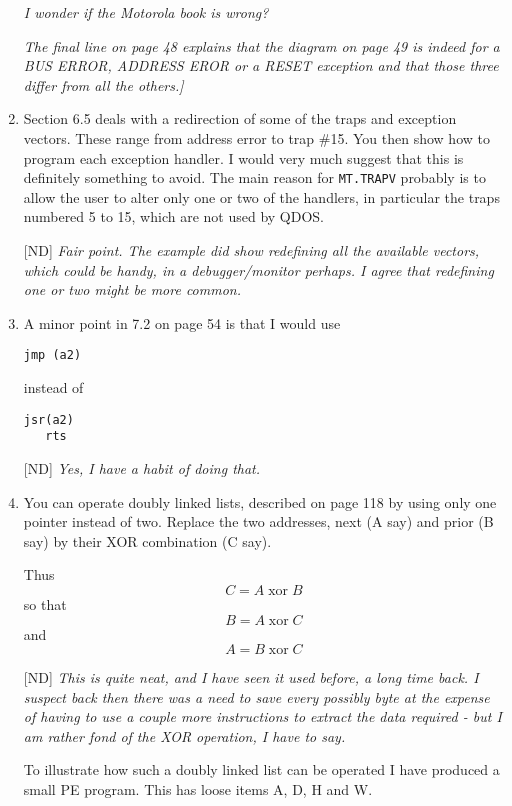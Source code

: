 \begin{enumerate}
\emph{I wonder if the Motorola book is wrong?}

\emph{The final line on page 48 explains that the diagram on page 49 is indeed for a BUS ERROR, ADDRESS EROR or a RESET exception and that those three differ from all the others.]}

\item Section 6.5 deals with a redirection of some of the traps and exception vectors. These range from address error to trap \#15. You then show how to program each exception handler. I would very much suggest that this is definitely something to avoid. The main reason for \texttt{MT.TRAPV} probably is to allow the user to alter only one or two of the handlers, in particular the traps numbered 5 to 15, which are not used by QDOS.

[ND] \emph{Fair point. The example did show redefining all the available vectors, which could be handy, in a debugger/monitor perhaps. I agree that redefining one or two might be more common.}

\item A minor point in 7.2 on page 54 is that I would use

\begin{lstlisting}[firstnumber=1,caption={Saving an RTS Instruction}]
   jmp (a2)
\end{lstlisting}

instead of

\begin{lstlisting}[firstnumber=1,caption={Wasting an RTS Instruction}]
   jsr(a2)
   rts
\end{lstlisting}

[ND]  \emph{Yes, I have a habit of doing that.}

\item You can operate doubly linked lists, described on page 118 by using only one pointer instead of two. Replace the two addresses, next (A say) and prior (B say) by their XOR combination (C say).

Thus $$C = A \operatorname{ xor } B$$ so that $$B = A \operatorname{ xor } C$$ and $$A = B \operatorname{ xor } C$$

[ND] \emph{This is quite neat, and I have seen it used before, a long time back. I suspect back then there was a need to save every possibly byte at the expense of having to use a couple more instructions to extract the data required - but I am rather fond of the XOR operation, I have to say.}

To illustrate how such a doubly linked list can be operated I have produced a small PE program. This has loose items A, D, H and W.


\end{enumerate}
